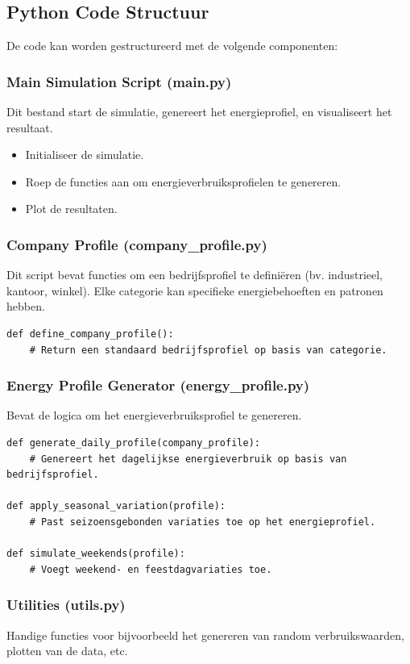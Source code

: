 \subsection{Python Code Structuur}
De code kan worden gestructureerd met de volgende componenten:

\subsubsection{Main Simulation Script (main.py)}
Dit bestand start de simulatie, genereert het energieprofiel, en visualiseert het resultaat.
\begin{itemize}
    \item Initialiseer de simulatie.
    \item Roep de functies aan om energieverbruiksprofielen te genereren.
    \item Plot de resultaten.
\end{itemize}

\subsubsection{Company Profile (company\_profile.py)}
Dit script bevat functies om een bedrijfsprofiel te definiëren (bv. industrieel, kantoor, winkel). Elke categorie kan specifieke energiebehoeften en patronen hebben.

\begin{verbatim}
def define_company_profile():
    # Return een standaard bedrijfsprofiel op basis van categorie.
\end{verbatim}

\subsubsection{Energy Profile Generator (energy\_profile.py)}
Bevat de logica om het energieverbruiksprofiel te genereren.

\begin{verbatim}
def generate_daily_profile(company_profile):
    # Genereert het dagelijkse energieverbruik op basis van bedrijfsprofiel.
    
def apply_seasonal_variation(profile):
    # Past seizoensgebonden variaties toe op het energieprofiel.

def simulate_weekends(profile):
    # Voegt weekend- en feestdagvariaties toe.
\end{verbatim}

\subsubsection{Utilities (utils.py)}
Handige functies voor bijvoorbeeld het genereren van random verbruikswaarden, plotten van de data, etc.

